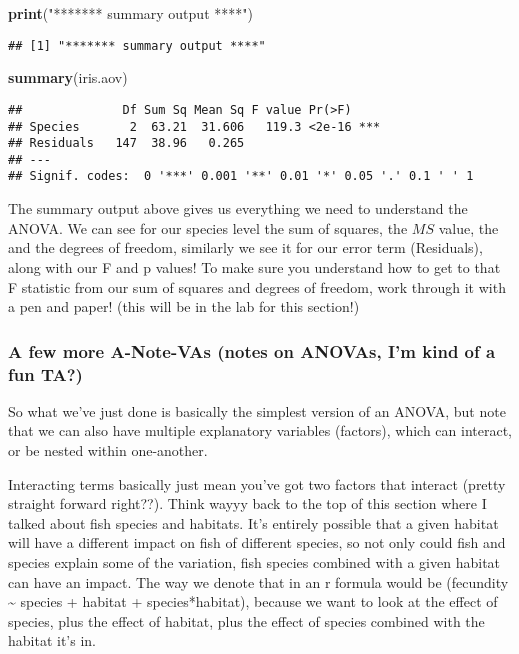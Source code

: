 \documentclass[
]{article}
\newenvironment{Shaded}{\begin{snugshade}}{\end{snugshade}}
\newcommand{\KeywordTok}[1]{\textcolor[rgb]{0.13,0.29,0.53}{\textbf{#1}}}
\newcommand{\NormalTok}[1]{#1}
\newcommand{\StringTok}[1]{\textcolor[rgb]{0.31,0.60,0.02}{#1}}
\begin{document}
\begin{Shaded}
\begin{Highlighting}[]
\KeywordTok{print}\NormalTok{(}\StringTok{"******* summary output ****"}\NormalTok{)}
\end{Highlighting}
\end{Shaded}

\begin{verbatim}
## [1] "******* summary output ****"
\end{verbatim}

\begin{Shaded}
\begin{Highlighting}[]
\KeywordTok{summary}\NormalTok{(iris.aov)}
\end{Highlighting}
\end{Shaded}

\begin{verbatim}
##              Df Sum Sq Mean Sq F value Pr(>F)    
## Species       2  63.21  31.606   119.3 <2e-16 ***
## Residuals   147  38.96   0.265                   
## ---
## Signif. codes:  0 '***' 0.001 '**' 0.01 '*' 0.05 '.' 0.1 ' ' 1
\end{verbatim}

The summary output above gives us everything we need to understand the
ANOVA. We can see for our species level the sum of squares, the \(MS\)
value, the and the degrees of freedom, similarly we see it for our error
term (Residuals), along with our F and p values! To make sure you
understand how to get to that F statistic from our sum of squares and
degrees of freedom, work through it with a pen and paper! (this will be
in the lab for this section!)

\hypertarget{a-few-more-a-note-vas-notes-on-anovas-im-kind-of-a-fun-ta}{%
\subsubsection{A few more A-Note-VAs (notes on ANOVAs, I'm kind of a fun
TA?)}\label{a-few-more-a-note-vas-notes-on-anovas-im-kind-of-a-fun-ta}}

So what we've just done is basically the simplest version of an ANOVA,
but note that we can also have multiple explanatory variables (factors),
which can interact, or be nested within one-another.

Interacting terms basically just mean you've got two factors that
interact (pretty straight forward right??). Think wayyy back to the top
of this section where I talked about fish species and habitats. It's
entirely possible that a given habitat will have a different impact on
fish of different species, so not only could fish and species explain
some of the variation, fish species combined with a given habitat can
have an impact. The way we denote that in an r formula would be
(fecundity \textasciitilde{} species + habitat + species*habitat),
because we want to look at the effect of species, plus the effect of
habitat, plus the effect of species combined with the habitat it's in.
\end{document}
